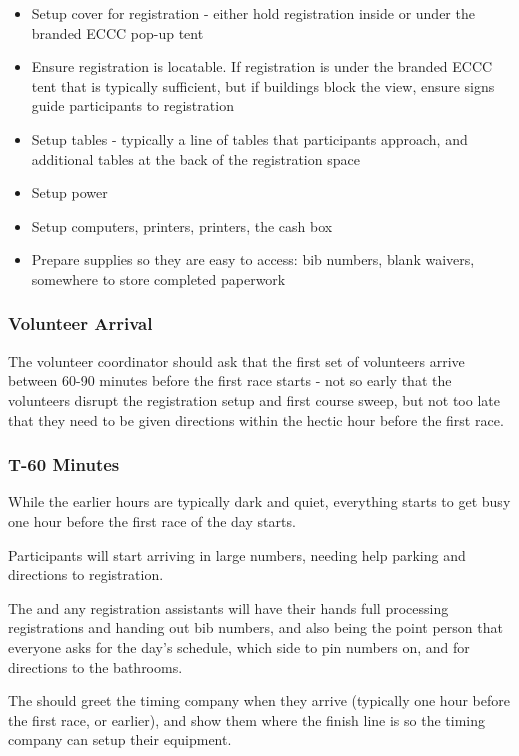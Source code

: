 \begin{itemize}
  \item Setup cover for registration - either hold registration inside or under the branded ECCC pop-up tent
  \item Ensure registration is locatable. If registration is under the branded ECCC tent that is typically sufficient, but if buildings block the view,
    ensure signs guide participants to registration
  \item Setup tables - typically a line of tables that participants approach, and additional tables at the back of the registration space
  \item Setup power
  \item Setup computers, printers, printers, the cash box
  \item Prepare supplies so they are easy to access: bib numbers, blank waivers, somewhere to store completed paperwork
\end{itemize}

\subsubsection{Volunteer Arrival}

The volunteer coordinator should ask that the first set of volunteers arrive between 60-90 minutes before the first race starts -
not so early that the volunteers disrupt the registration setup and first course sweep, but not too late that they need to be given directions
within the hectic hour before the first race.

\subsubsection{T-60 Minutes}

While the earlier hours are typically dark and quiet, everything starts to get busy one hour before the first race of the day starts.

Participants will start arriving in large numbers, needing help parking and directions to registration.

The  and any registration assistants will have their hands full processing registrations and handing out bib numbers,
and also being the point person that everyone asks for the day's schedule, which side to pin numbers on, and for directions to the bathrooms.

The  should greet the timing company when they arrive (typically one hour before the first race, or earlier),
and show them where the finish line is so the timing company can setup their equipment.

